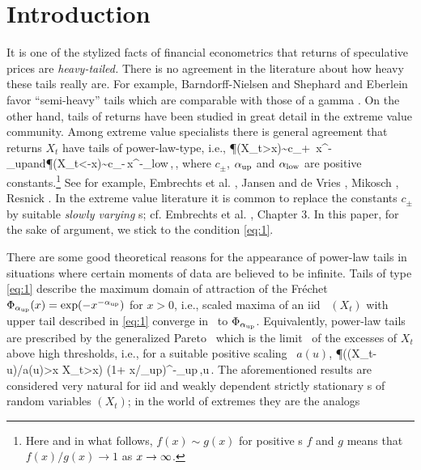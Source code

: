 \section{Introduction}\setcounter{equation}{0}
It is one of the stylized facts of financial econometrics that 
returns of speculative prices are {\em heavy-tailed.} There is no agreement
in the literature about how heavy these tails really are. For example, Barndorff-Nielsen and Shephard
\cite{barndorff:shephard:2001} and Eberlein \cite{eberlein:2001} favor ``semi-heavy'' tails
which are comparable with those of a gamma \ds . On the other
hand, tails of returns have been studied in great detail 
in the extreme value community. Among extreme value specialists
there is general agreement that returns $X_t$ have tails of power-law-type, i.e.,
\beam\label{eq:1}
\P(X_t>x)\sim c_+ \,x^{-\alpha_{\rm up}}\quad\mbox{and}\quad \P(X_t<-x)\sim c_-\,x^{-\alpha_{\rm low}}\,,\quad\xto\,,
\eeam  
where $c_{\pm}$, $\alpha_{\rm up}$ and $\alpha_{\rm low}$ are positive constants.\footnote{Here and in what
  follows, $f(x)\sim g(x)$ for positive \fct s $f$ and $g$ means 
that $f(x)/g(x)\to 1$ as $x\to\infty$.} See for example, Embrechts et
al. \cite{embrechts:klueppelberg:mikosch:1997}, Jansen and de Vries
\cite{jansen1991frequency}, Mikosch \cite{mikosch:2003}, Resnick
\cite{resnick:2007}.  
In the extreme value literature it is common to replace the constants $c_\pm$ by suitable
{\em slowly varying} \fct s; cf. Embrechts et
al. \cite{embrechts:klueppelberg:mikosch:1997}, Chapter 3. In this
paper, for the  
sake of argument, we stick to the condition \eqref{eq:1}.
\par
There are some good theoretical reasons for the appearance of power-law tails in situations where certain moments 
of data are believed to be infinite. Tails of type \eqref{eq:1}
describe the maximum domain of attraction of the  
Fr\'echet \ds\ $\Phi_{\alpha_{\rm up}}(x)=\exp(-x^{-\alpha_{\rm up}})$ for $x>0$, i.e., scaled maxima of an iid \seq\ $(X_t)$ with
upper tail described in \eqref{eq:1} converge in \ds\ to $\Phi_{\alpha_{\rm up}}$.
Equivalently, power-law tails are prescribed by the 
generalized Pareto \ds\ which is the limit \ds\ of the excesses of $X_t$ above high thresholds, i.e., for a suitable positive scaling \fct\ $a(u)$,
\beao
\P((X_t-u)/a(u)>x \mid X_t>x) \to (1+ x/\alpha_{\rm up})^{-\alpha_{\rm up}}\,,\qquad u\to\infty\,.
\eeao
The aforementioned results 
are considered very natural for iid and weakly dependent strictly stationary \seq s of random variables $(X_t)$; 
in the world of extremes they are the analogs
